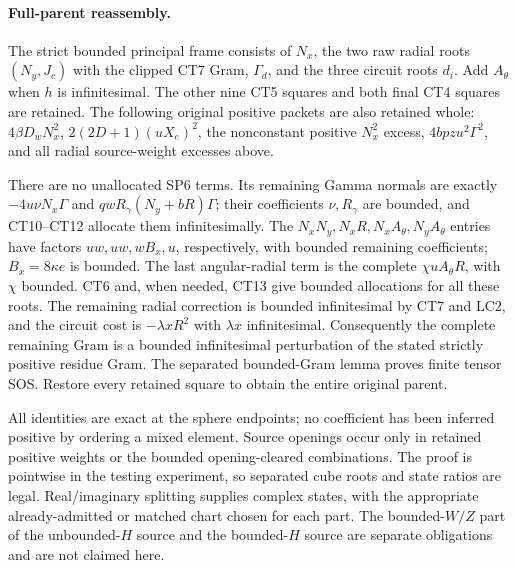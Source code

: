 \paragraph{Full-parent reassembly.}
The strict bounded principal frame consists of $N_x$, the two raw
radial roots $(N_y,J_c)$ with the clipped CT7 Gram, $\Gamma_d$,
and the three circuit roots $d_i$.  Add $A_\theta$ when $h$ is
infinitesimal.  The other nine CT5 squares and both final CT4
squares are retained.  The following original positive packets
are also retained whole: $4\beta D_wN_x^2$,
$2(2D+1)(uX_e)^2$, the nonconstant positive $N_x^2$ excess,
$4bpzu^2\Gamma^2$, and all radial source-weight excesses above.

There are no unallocated SP6 terms.  Its remaining Gamma normals
are exactly $-4u\nu N_x\Gamma$ and
$qwR_\gamma(N_y+bR)\Gamma$; their coefficients $\nu,R_\gamma$
are bounded, and CT10--CT12 allocate them infinitesimally.
The $N_xN_y,N_xR,N_xA_\theta,N_yA_\theta$ entries have factors
$uw,uw,wB_x,u$, respectively, with bounded remaining coefficients;
$B_x=8\kappa e$ is bounded.  The last angular-radial term is the
complete $\chi uA_\theta R$, with $\chi$ bounded.  CT6 and,
when needed, CT13 give bounded allocations for all these roots.
The remaining radial correction is bounded infinitesimal by CT7
and LC2, and the circuit cost is $-\lambda xR^2$ with
$\lambda x$ infinitesimal.  Consequently the complete remaining
Gram is a bounded infinitesimal perturbation of the stated strictly
positive residue Gram.  The separated bounded-Gram lemma proves
finite tensor SOS.  Restore every retained square to obtain the
entire original parent.

All identities are exact at the sphere endpoints; no coefficient
has been inferred positive by ordering a mixed element.  Source
openings occur only in retained positive weights or the bounded
opening-cleared combinations.  The proof is pointwise in the
testing experiment, so separated cube roots and state ratios are
legal.  Real/imaginary splitting supplies complex states, with the
appropriate already-admitted or matched chart chosen for each part.
The bounded-$W/Z$ part of the unbounded-$H$ source and the
bounded-$H$ source are separate obligations and are not claimed here.
